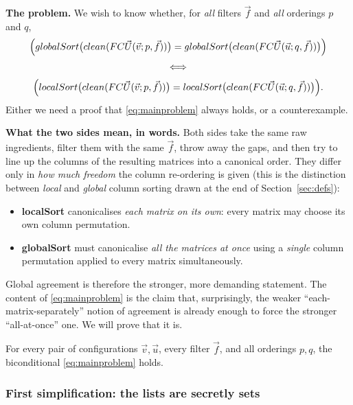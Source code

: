 \medskip
\noindent\textbf{The problem.}
We wish to know whether, for \emph{all} filters $\vec f$ and \emph{all} orderings
$p$ and $q$,
\begin{gather}
\Bigl(
globalSort\bigl(clean(FC\vec U(\vec v;p,\vec f))\bigr)
=
globalSort\bigl(clean(FC\vec U(\vec u;q,\vec f))\bigr)
\Bigr)
\nonumber\\[2pt]
\iff
\label{eq:mainproblem}\\[2pt]
\Bigl(
localSort\bigl(clean(FC\vec U(\vec v;p,\vec f))\bigr)
=
localSort\bigl(clean(FC\vec U(\vec u;q,\vec f))\bigr)
\Bigr).
\nonumber
\end{gather}
Either we need a proof that \eqref{eq:mainproblem} always holds, or a counterexample.

\medskip
\noindent\textbf{What the two sides mean, in words.}
Both sides take the same raw ingredients, filter them with the same $\vec f$,
throw away the gaps, and then try to line up the columns of the resulting
matrices into a canonical order.  They differ only in \emph{how much freedom} the
column re-ordering is given (this is the distinction between \emph{local} and
\emph{global} column sorting drawn at the end of Section~\ref{sec:defs}):
\begin{itemize}
  \item \textbf{localSort} canonicalises \emph{each matrix on its own}: every
        matrix may choose its own column permutation.
  \item \textbf{globalSort} must canonicalise \emph{all the matrices at once}
        using a \emph{single} column permutation applied to every matrix
        simultaneously.
\end{itemize}
Global agreement is therefore the stronger, more demanding statement.  The
content of \eqref{eq:mainproblem} is the claim that, surprisingly, the weaker
``each-matrix-separately'' notion of agreement is already enough to force the
stronger ``all-at-once'' one.  We will prove that it is.

\begin{theorem}\label{thm:main}
For every pair of configurations $\vec v,\vec u$, every filter $\vec f$, and all
orderings $p,q$, the biconditional \eqref{eq:mainproblem} holds.
\end{theorem}

\subsubsection*{First simplification: the lists are secretly sets}

